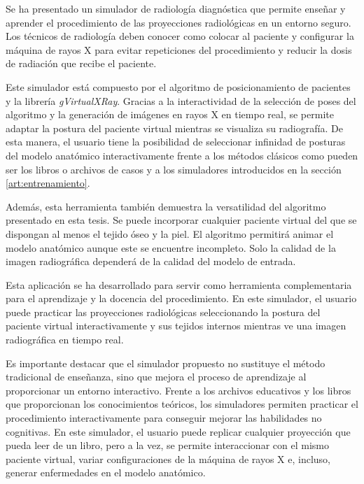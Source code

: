 Se ha presentado un simulador de radiología diagnóstica que permite enseñar y aprender el procedimiento de las proyecciones radiológicas en un entorno seguro. Los técnicos de radiología deben conocer como colocar al paciente y configurar la máquina de rayos X para evitar repeticiones del procedimiento y reducir la dosis de radiación que recibe el paciente.

Este simulador está compuesto por el algoritmo de posicionamiento de pacientes y la librería \emph{gVirtualXRay}. Gracias a la interactividad de la selección de poses del algoritmo y la generación de imágenes en rayos X en tiempo real, se permite adaptar la postura del paciente virtual mientras se visualiza su radiografía. De esta manera, el usuario tiene la posibilidad de seleccionar infinidad de posturas del modelo anatómico interactivamente frente a los métodos clásicos como pueden ser los libros o archivos de casos y a los simuladores introducidos en la sección \ref{art:entrenamiento}.

Además, esta herramienta también demuestra la versatilidad del algoritmo presentado en esta tesis. Se puede incorporar cualquier paciente virtual del que se dispongan al menos el tejido óseo y la piel. El algoritmo permitirá animar el modelo anatómico aunque este se encuentre incompleto. Solo la calidad de la imagen radiográfica dependerá de la calidad del modelo de entrada.

Esta aplicación se ha desarrollado para servir como herramienta complementaria para el aprendizaje y la docencia del procedimiento. %
En este simulador, el usuario puede practicar las proyecciones radiológicas seleccionando la postura del paciente virtual interactivamente y sus tejidos internos mientras ve una imagen radiográfica en tiempo real. 

Es importante destacar que el simulador propuesto no sustituye el método tradicional de enseñanza, sino que mejora el proceso de aprendizaje al proporcionar un entorno interactivo. Frente a los archivos educativos y los libros que proporcionan los conocimientos teóricos, los simuladores permiten practicar el procedimiento interactivamente para conseguir mejorar las habilidades no cognitivas. En este simulador, el usuario puede replicar cualquier proyección que pueda leer de un libro, pero a la vez, se permite interaccionar con el mismo paciente virtual, variar configuraciones de la máquina de rayos X e, incluso, generar enfermedades en el modelo anatómico.

